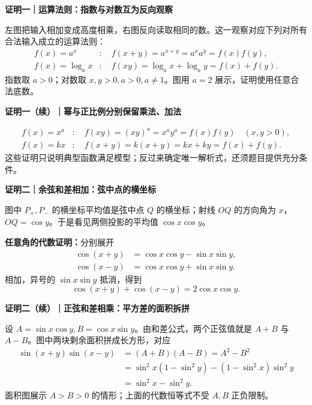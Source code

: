 \FReserve{7.5cm}
\begin{proofbox}
\textbf{\textcolor{CProof}{证明一｜运算法则：指数与对数互为反向观察}}

左图把输入相加变成高度相乘，右图反向读取相同的数。这一观察对应下列对所有合法输入成立的运算法则：
\[
\begin{aligned}
f(x)=a^x&:\quad f(x+y)=a^{x+y}=a^xa^y=f(x)f(y),\\
f(x)=\log_a x&:\quad f(xy)=\log_a x+\log_a y=f(x)+f(y).
\end{aligned}
\]
指数取 $a>0$；对数取 $x,y>0,a>0,a\ne1$。图用 $a=2$ 展示，证明使用任意合法底数。
\end{proofbox}

\FReserve{7.5cm}
\begin{proofbox}
\textbf{\textcolor{CProof}{证明一（续）｜幂与正比例分别保留乘法、加法}}

\[
\begin{aligned}
f(x)=x^a&:\quad f(xy)=(xy)^a=x^ay^a=f(x)f(y)\quad(x,y>0),\\
f(x)=kx&:\quad f(x+y)=k(x+y)=kx+ky=f(x)+f(y).
\end{aligned}
\]
这些证明只说明典型函数满足模型；反过来确定唯一解析式，还须题目提供充分条件。
\end{proofbox}

\FReserve{7.5cm}
\begin{proofbox}
\textbf{\textcolor{CProof}{证明二｜余弦和差相加：弦中点的横坐标}}

图中 $P_+,P_-$ 的横坐标平均值是弦中点 $Q$ 的横坐标；射线 $OQ$ 的方向角为 $x$，$OQ=\cos y$。于是看见两侧投影的平均值 $\cos x\cos y$。

\textbf{任意角的代数证明：}分别展开
\[
\begin{aligned}
\cos(x+y)&=\cos x\cos y-\sin x\sin y,\\
\cos(x-y)&=\cos x\cos y+\sin x\sin y.
\end{aligned}
\]
相加，异号的 $\sin x\sin y$ 抵消，得到
\[\boxed{\cos(x+y)+\cos(x-y)=2\cos x\cos y}.\]
\end{proofbox}

\FReserve{7.5cm}
\begin{proofbox}
\textbf{\textcolor{CProof}{证明二（续）｜正弦和差相乘：平方差的面积拆拼}}

设 $A=\sin x\cos y,B=\cos x\sin y$。由和差公式，两个正弦值就是 $A+B$ 与 $A-B$。图中两块剩余面积拼成长方形，对应
\[
\begin{aligned}
\sin(x+y)\sin(x-y)&=(A+B)(A-B)=A^2-B^2\\
&=\sin^2x(1-\sin^2y)-(1-\sin^2x)\sin^2y\\
&=\boxed{\sin^2x-\sin^2y}.
\end{aligned}
\]
面积图展示 $A>B>0$ 的情形；上面的代数恒等式不受 $A,B$ 正负限制。
\end{proofbox}

